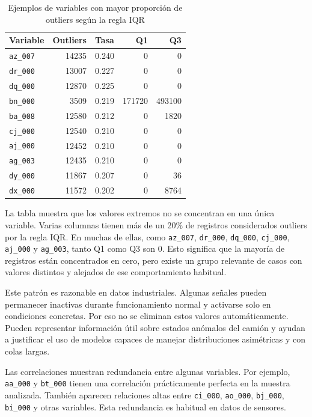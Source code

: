\documentclass[11pt,a4paper]{article}
\begin{document}
\begin{table}[H]
\centering
\caption{Ejemplos de variables con mayor proporción de outliers según la regla IQR}
\label{tab_outliers_iqr_resumen}
\small
\begin{tabular}{@{}lrrrr@{}}
\toprule
\textbf{Variable} & \textbf{Outliers} & \textbf{Tasa} & \textbf{Q1} & \textbf{Q3}\\
\midrule
\texttt{az\_007} & 14235 & 0.240 & 0 & 0\\
\texttt{dr\_000} & 13007 & 0.227 & 0 & 0\\
\texttt{dq\_000} & 12870 & 0.225 & 0 & 0\\
\texttt{bn\_000} & 3509 & 0.219 & 171720 & 493100\\
\texttt{ba\_008} & 12580 & 0.212 & 0 & 1820\\
\texttt{cj\_000} & 12540 & 0.210 & 0 & 0\\
\texttt{aj\_000} & 12452 & 0.210 & 0 & 0\\
\texttt{ag\_003} & 12435 & 0.210 & 0 & 0\\
\texttt{dy\_000} & 11867 & 0.207 & 0 & 36\\
\texttt{dx\_000} & 11572 & 0.202 & 0 & 8764\\
\bottomrule
\end{tabular}
\end{table}

La tabla muestra que los valores extremos no se concentran en una única variable. Varias columnas tienen más de un 20\% de registros considerados outliers por la regla IQR. En muchas de ellas, como \texttt{az\_007}, \texttt{dr\_000}, \texttt{dq\_000}, \texttt{cj\_000}, \texttt{aj\_000} y \texttt{ag\_003}, tanto Q1 como Q3 son 0. Esto significa que la mayoría de registros están concentrados en cero, pero existe un grupo relevante de casos con valores distintos y alejados de ese comportamiento habitual.

Este patrón es razonable en datos industriales. Algunas señales pueden permanecer inactivas durante funcionamiento normal y activarse solo en condiciones concretas. Por eso no se eliminan estos valores automáticamente. Pueden representar información útil sobre estados anómalos del camión y ayudan a justificar el uso de modelos capaces de manejar distribuciones asimétricas y con colas largas.

Las correlaciones muestran redundancia entre algunas variables. Por ejemplo, \texttt{aa\_000} y \texttt{bt\_000} tienen una correlación prácticamente perfecta en la muestra analizada. También aparecen relaciones altas entre \texttt{ci\_000}, \texttt{ao\_000}, \texttt{bj\_000}, \texttt{bi\_000} y otras variables. Esta redundancia es habitual en datos de sensores.
\end{document}
